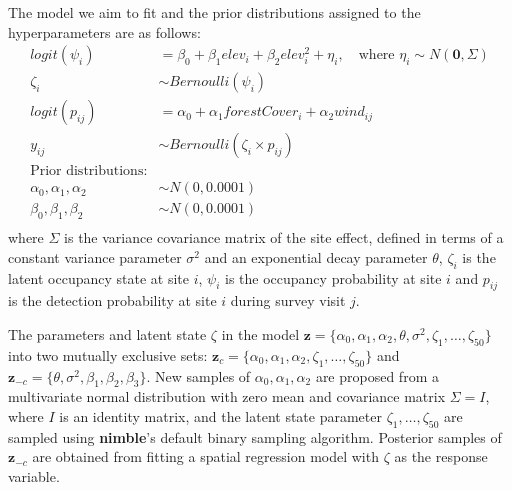 \documentclass[
]{article}
\begin{document}
The model we aim to fit and the prior distributions assigned to the
hyperparameters are as follows: \begin{equation}
\begin{split}
logit(\psi_i) &= \beta_0 + \beta_1 elev_{i} + \beta_2 elev_{i}^{2} + \eta_i, \quad \text{where $\eta_i \sim N(\mathbf{0}, \mathbb{\Sigma})$} \\
\zeta_i &\sim Bernoulli (\psi_i)\\
logit(p_{ij}) &= \alpha_0 + \alpha_1 forestCover_{i} + \alpha_2 wind_{ij}\\
y_{ij} &\sim Bernoulli(\zeta_i \times p_{ij})\\
\text{Prior distributions:}\\
\alpha_0, \alpha_1, \alpha_2 &\sim N(0, 0.0001) \\
\beta_0, \beta_1, \beta_2 &\sim N(0, 0.0001)\\
\end{split}
\end{equation} where \(\mathbb{\Sigma}\) is the variance covariance
matrix of the site effect, defined in terms of a constant variance
parameter \(\sigma^2\) and an exponential decay parameter \(\theta\),
\(\zeta_i\) is the latent occupancy state at site \(i\), \(\psi_i\) is
the occupancy probability at site \(i\) and \(p_{ij}\) is the detection
probability at site \(i\) during survey visit \(j\).

The parameters and latent state \(\zeta\) in the model
\(\mathbf{z} = \{\alpha_0,\alpha_1,\alpha_2, \theta, \sigma^2, \zeta_1, \ldots, \zeta_{50} \}\)
into two mutually exclusive sets:
\(\mathbf{z}_c = \{\alpha_0,\alpha_1,\alpha_2, \zeta_1, \ldots, \zeta_{50} \}\)
and
\(\mathbf{z}_{-c} = \{\theta, \sigma^2, \beta_1, \beta_2, \beta_3 \}\).
New samples of \(\alpha_0,\alpha_1,\alpha_2\) are proposed from a
multivariate normal distribution with zero mean and covariance matrix
\(\Sigma = I\), where \(I\) is an identity matrix, and the latent state
parameter \(\zeta_1, \ldots, \zeta_{50}\) are sampled using
\textbf{nimble}'s default binary sampling algorithm. Posterior samples
of \(\mathbf{z}_{-c}\) are obtained from fitting a spatial regression
model with \(\zeta\) as the response variable.
\end{document}

